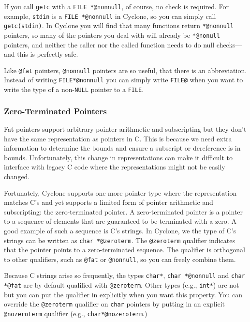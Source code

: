 If you call \texttt{getc} with a \texttt{FILE *@nonnull}, of course, no check
is required.  For example, \texttt{stdin} is a \texttt{FILE *@nonnull} in
Cyclone, so you can simply call \texttt{getc(stdin)}.  In Cyclone you
will find that many functions return \texttt{*@nonnull} pointers, so many of
the pointers you deal with will already be \texttt{*@nonull} pointers, and
neither the caller nor the called function needs to do null
checks---and this is perfectly safe.

Like \texttt{@fat} pointers, \texttt{@nonnull} pointers are so useful,
that there is an abbreviation.  Instead of writing \texttt{FILE*@nonnull}
you can simply write \texttt{FILE@} when you want to write the
type of a non-\texttt{NULL} pointer to a \texttt{FILE}.

\subsubsection*{Zero-Terminated Pointers}

Fat pointers support arbitrary pointer arithmetic and subscripting
but they don't have the same representation as pointers in C.  This
is because we need extra information to determine the bounds and
ensure a subscript or dereference is in bounds.  Unfortunately,
this change in representations can make it difficult to interface
with legacy C code where the representations might not be easily
changed.  

Fortunately, Cyclone supports one more pointer type where the
representation matches C's and yet supports a limited form of
pointer arithmetic and subscripting:  the zero-terminated pointer.
A zero-terminated pointer is a pointer to a sequence of elements
that are guaranteed to be terminated with a zero.  A good
example of such a sequence is C's strings.  In Cyclone, we
the type of C's strings can be written as \texttt{char *@zeroterm}.
The \texttt{@zeroterm} qualifier indicates that the pointer
points to a zero-terminated sequence.  The qualifier is
orthogonal to other qualifiers, such as \texttt{@fat} or
\texttt{@nonnull}, so you can freely combine them.

Because C strings arise so frequently, the types \texttt{char*}, 
\texttt{char *@nonnull} and \texttt{char *@fat} are by default qualified
with \texttt{@zeroterm}.  Other types (e.g., \texttt{int*}) are
not but you can put the qualifier in explicitly when you want
this property.  You can override the \texttt{@zeroterm} qualifier
on \texttt{char} pointers by putting in an explicit
\texttt{@nozeroterm} qualifier (e.g., \texttt{char*@nozeroterm}.)

